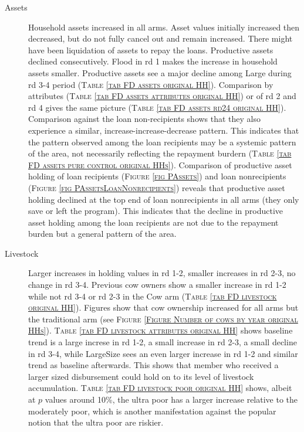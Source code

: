 \begin{description}
\item[Assets]	Household assets increased in all arms. Asset values initially increased then decreased, but do not fully cancel out and remain increased. There might have been liquidation of assets to repay the loans. Productive assets declined consecutively. Flood in rd 1 makes the increase in household assets smaller. Productive assets see a major decline among \textsf{Large} during rd 3-4 period (\textsc{\normalsize Table \ref{tab FD assets original HH}}). Comparison by attributes (\textsc{\normalsize Table \ref{tab FD assets attributes original HH}}) or of rd 2 and rd 4 gives the same picture (\textsc{\normalsize Table \ref{tab FD assets rd24 original HH}}). Comparison against the loan non-recipients shows that they also experience a similar, increase-increase-decrease pattern. This indicates that the pattern observed among the loan recipients may be a systemic pattern of the area, not necessarily reflecting the repayment burdern (\textsc{\normalsize Table \ref{tab FD assets pure control original HHs}}). Comparison of productive asset holding of loan recipients (\textsc{\footnotesize Figure \ref{fig PAssets}}) and loan nonrecipients (\textsc{\footnotesize Figure \ref{fig PAssetsLoanNonrecipients}}) reveals that productive asset holding declined at the top end of loan nonrecipients in all arms (they only save or left the program). This indicates that the decline in productive asset holding among the loan recipients are not due to the repayment burden but a general pattern of the area.
\item[Livestock]	Larger increases in holding values in rd 1-2, smaller increases in rd 2-3, no change in rd 3-4. Previous cow owners show a smaller increase in rd 1-2 while not rd 3-4 or rd 2-3 in the \textsf{Cow} arm (\textsc{\normalsize Table \ref{tab FD livestock original HH}}). Figures show that cow ownership increased for all arms but the \textsf{traditional} arm (see \textsc{\normalsize Figure \ref{Figure Number of cows by year original HHs}}). \textsc{\normalsize Table \ref{tab FD livestock attributes original HH}} shows baseline trend is a large increse in rd 1-2, a small increase in rd 2-3, a small decline in rd 3-4, while \textsf{LargeSize} sees an even larger increase in rd 1-2 and similar trend as baseline afterwards. This shows that member who received a larger sized disbursement could hold on to its level of livestock accumulation. \textsc{\normalsize Table \ref{tab FD livestock poor original HH}} shows, albeit at $p$ values around 10\%, the ultra poor has a larger increase relative to the moderately poor, which is another manifestation against the popular notion that the ultra poor are riskier.

\end{description}
